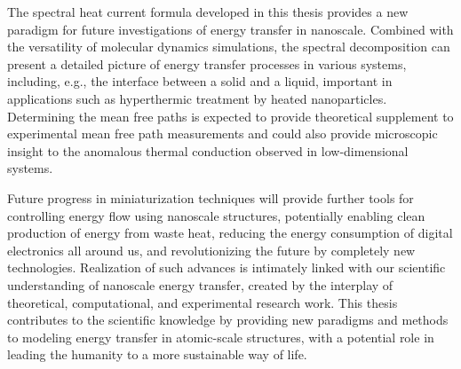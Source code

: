 The spectral heat current formula developed in this thesis provides a new paradigm for future investigations of energy transfer in nanoscale. Combined with the versatility of molecular dynamics simulations, the spectral decomposition can present a detailed picture of energy transfer processes in various systems, including, e.g., the interface between a solid and a liquid, important in applications such as hyperthermic treatment by heated nanoparticles. Determining the mean free paths is expected to provide theoretical supplement to experimental mean free path measurements and could also provide microscopic insight to the anomalous thermal conduction observed in low-dimensional systems.

Future progress in miniaturization techniques will provide further tools for controlling energy flow using nanoscale structures, potentially enabling clean production of energy from waste heat, reducing the energy consumption of digital electronics all around us, and revolutionizing the future by completely new technologies. Realization of such advances is intimately linked with our scientific understanding of nanoscale energy transfer, created by the interplay of theoretical, computational, and experimental research work. This thesis contributes to the scientific knowledge by providing new paradigms and methods to modeling energy transfer in atomic-scale structures, with a potential role in leading the humanity to a more sustainable way of life. 







